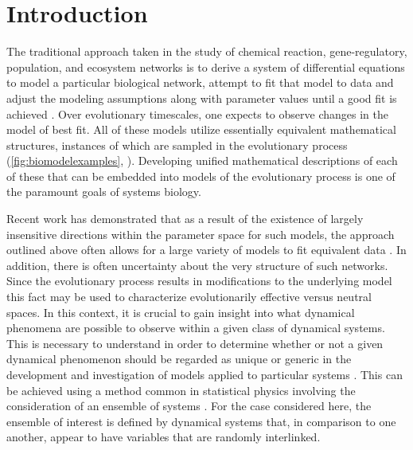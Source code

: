 \section{Introduction}

The traditional approach taken in the study of chemical reaction, gene-regulatory, population, and ecosystem networks is to derive a system of differential equations to model a particular biological network, attempt to fit that model to data and adjust the modeling assumptions along with parameter values until a good fit is achieved \cite{Meyer2014}. Over evolutionary timescales, one expects to observe changes in the model of best fit. All of these models utilize essentially equivalent mathematical structures, instances of which are sampled in the evolutionary process (\ref{fig:biomodelexamples}, \cite{RossCr2003,Palsson2011a,Sauro2012}). Developing unified mathematical descriptions of each of these that can be embedded into models of the evolutionary process is one of the paramount goals of systems biology.

Recent work has demonstrated that as a result of the existence of largely insensitive directions within the parameter space for such models, the approach outlined above often allows for a large variety of models to fit equivalent data \cite{Machta2013,Hines2014,Prabakaran2014,Tonsing2014}. In addition, there is often uncertainty about the very structure of such networks. Since the evolutionary process results in modifications to the underlying model this fact may be used to characterize evolutionarily effective versus neutral spaces. In this context, it is crucial to gain insight into what dynamical phenomena are possible to observe within a given class of dynamical systems. This is necessary to understand in order to determine whether or not a given dynamical phenomenon should be regarded as unique or generic in the development and investigation of models applied to particular systems \cite{Gunawardena2013,Gunawardena2014}. This can be achieved using a method common in statistical physics involving the consideration of an ensemble of systems \cite{Bialek2012}. For the case considered here, the ensemble of interest is defined by dynamical systems that, in comparison to one another, appear to have variables that are randomly interlinked.


